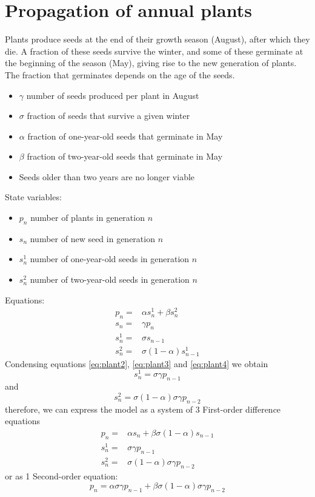 \section{Propagation of annual plants}
Plants produce seeds at the end of their growth season (August), after which they die. A fraction of these seeds survive the winter, and some of these germinate at the beginning of the season (May), giving rise to the new generation of plants. The fraction that germinates depends on the age of the seeds. 
\begin{itemize}
\item $\gamma$ number of seeds produced per plant in August
\item $\sigma$ fraction of seeds that survive a given winter
\item $\alpha$ fraction of one-year-old seeds that germinate in May
\item $\beta$ fraction of two-year-old seeds that germinate in May
\item Seeds older than two years are no longer viable
\end{itemize}

State variables:
\begin{itemize}
\item $p_n$ number of plants in generation $n$
\item $s_n$ number of new seed in generation $n$
\item $s^1_n$ number of one-year-old seeds in generation $n$
\item $s_{n}^{2}$ number of two-year-old seeds in generation $n$
\end{itemize}
Equations:
\begin{subequations}\label{eq:plant}
\begin{align}
p_n=&\alpha s^1_n+\beta s_{n}^{2}\label{eq:plant1}\\
s_{n}=&\gamma p_{n}\label{eq:plant2}\\
s_n^1=&\sigma s_{n-1}\label{eq:plant3}\\
s_{n}^{2}=&\sigma (1-\alpha)s^1_{n-1}\label{eq:plant4}
\end{align}   
\end{subequations} 
Condensing equations \eqref{eq:plant2}, \eqref{eq:plant3} and \eqref{eq:plant4} we obtain
$$s_n^1=\sigma \gamma p_{n-1}$$
and 
$$s_{n}^{2}=\sigma (1-\alpha)\sigma \gamma p_{n-2}$$
therefore, we can express the model as a system of 3 First-order difference equations
\begin{equation*}
\begin{array}{ll}
p_n=&\alpha s_n+\beta \sigma (1-\alpha)s_{n-1}\\
s_n^1=&\sigma \gamma p_{n-1}\\
s_{n}^{2}=&\sigma (1-\alpha)\sigma \gamma p_{n-2}
\end{array}
\end{equation*}
or as 1 Second-order equation:
\begin{equation}\label{eq:PLANTS}
p_n=\alpha \sigma \gamma p_{n-1}+\beta \sigma (1-\alpha)\sigma \gamma p_{n-2}
\end{equation}

